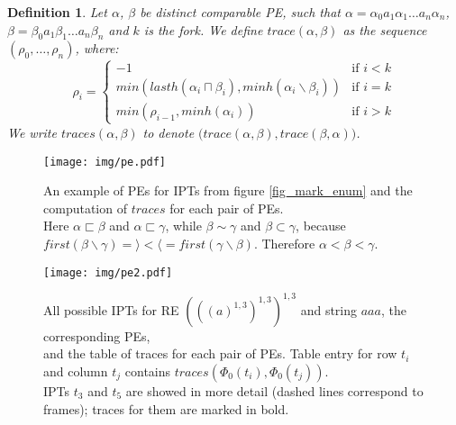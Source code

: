 \documentclass[AMA,STIX1COL]{WileyNJD-v2}
\newcommand{\Xl}{\langle}
\newcommand{\Xr}{\rangle}
\newtheorem{Xdef}{Definition}
\begin{document}
    \begin{Xdef}
    Let $\alpha$, $\beta$ be distinct comparable PE, such that
    $\alpha = \alpha_0 a_1 \alpha_1 \dots a_n \alpha_n$,
    $\beta = \beta_0 a_1 \beta_1 \dots a_n \beta_n$ and $k$ is the fork.
    We define $trace (\alpha, \beta)$ as the sequence $(\rho_0, \dots, \rho_n)$, where:
    $$
    \rho_i = \begin{cases}
        -1 &\text{if } i < k \\
        min (lasth (\alpha_i \sqcap \beta_i), minh(\alpha_i \backslash \beta_i)) &\text{if } i = k \\
        min (\rho_{i-1}, minh(\alpha_i)) &\text{if } i > k
    \end{cases}
    $$
    We write $traces(\alpha, \beta)$ to denote $\big( trace (\alpha, \beta), trace (\beta, \alpha) \big)$.
    \end{Xdef}

\begin{figure}\label{fig_pe}
\texttt{[image: img/pe.pdf]}
\caption{
An example of PEs for IPTs from figure \ref{fig_mark_enum} and the computation of $traces$ for each pair of PEs.\\
Here $\alpha \sqsubset \beta$ and $\alpha \sqsubset \gamma$, while
$\beta \sim \gamma$ and $\beta \subset \gamma$,
because $first (\beta \backslash \gamma) = \Xr < \Xl = first (\gamma \backslash \beta)$.
Therefore $\alpha < \beta < \gamma$.
}
\end{figure}

\begin{figure}\label{fig_pe2}
\texttt{[image: img/pe2.pdf]}
\caption{
All possible IPTs for RE $(((a)^{1,3})^{1,3})^{1,3}$ and string $aaa$, the corresponding PEs,\\
and the table of traces for each pair of PEs.
Table entry for row $t_i$ and column $t_j$ contains $traces(\Phi_0(t_i), \Phi_0(t_j))$.\\
IPTs $t_3$ and $t_5$ are showed in more detail
(dashed lines correspond to frames);
traces for them are marked in bold.
}
\end{figure}
\end{document}

